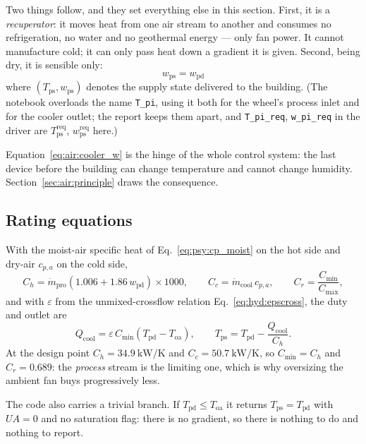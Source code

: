 \documentclass[11pt]{article}
\newcommand{\md}{\ensuremath{\dot m}}
\newcommand{\mdp}{\ensuremath{\dot m_{\mathrm{pro}}}}
\newcommand{\UA}{\ensuremath{U\!A}}
\begin{document}
Two things follow, and they set everything else in this section. First, it is a
\emph{recuperator}: it moves heat from one air stream to another and consumes
no refrigeration, no water and no geothermal energy --- only fan power. It
cannot manufacture cold; it can only pass heat down a gradient it is given.
Second, being dry, it is sensible only:
\begin{equation}
\boxed{\;w_{\mathrm{ps}} = w_{\mathrm{pd}}\;}
\label{eq:air:cooler_w}
\end{equation}
where $(T_{\mathrm{ps}},w_{\mathrm{ps}})$ denotes the supply state delivered to
the building. (The notebook overloads the name \texttt{T\_pi}, using it both
for the wheel's process inlet and for the cooler outlet; the report keeps them
apart, and \texttt{T\_pi\_req}, \texttt{w\_pi\_req} in the driver are
$T_{\mathrm{ps}}^{\mathrm{req}}$, $w_{\mathrm{ps}}^{\mathrm{req}}$ here.)

Equation~\eqref{eq:air:cooler_w} is the hinge of the whole control system: the
last device before the building can change temperature and cannot change
humidity. Section~\ref{sec:air:principle} draws the consequence.

\subsection{Rating equations}
\label{sec:air:coolerrate}

With the moist-air specific heat of Eq.~\eqref{eq:psy:cp_moist} on the hot side
and dry-air $c_{p,a}$ on the cold side,
\begin{equation}
C_h = \mdp\left(1.006 + 1.86\,w_{\mathrm{pd}}\right)\times\num{1000},
\qquad
C_c = \md_{\mathrm{cool}}\,c_{p,a},
\qquad
C_r = \frac{C_{\min}}{C_{\max}} ,
\label{eq:air:caprates}
\end{equation}
and with $\varepsilon$ from the unmixed-crossflow relation
Eq.~\eqref{eq:hyd:epscross}, the duty and outlet are
\begin{equation}
Q_{\mathrm{cool}} = \varepsilon\,C_{\min}
\left(T_{\mathrm{pd}}-T_{\mathrm{oa}}\right),
\qquad
T_{\mathrm{ps}} = T_{\mathrm{pd}} - \frac{Q_{\mathrm{cool}}}{C_h} .
\label{eq:air:cooler_rate}
\end{equation}
At the design point $C_h=\SI{34.9}{\kilo\watt\per\kelvin}$ and
$C_c=\SI{50.7}{\kilo\watt\per\kelvin}$, so $C_{\min}=C_h$ and $C_r=0.689$: the
\emph{process} stream is the limiting one, which is why oversizing the ambient
fan buys progressively less.

The code also carries a trivial branch. If $T_{\mathrm{pd}}\le T_{\mathrm{oa}}$
it returns $T_{\mathrm{ps}}=T_{\mathrm{pd}}$ with $\UA=0$ and no saturation
flag: there is no gradient, so there is nothing to do and nothing to report.
\end{document}
